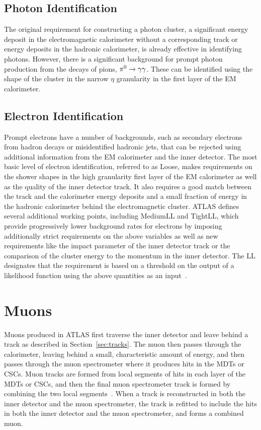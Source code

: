 \subsection{Photon Identification}

The original requirement for constructing a photon cluster, a significant energy deposit in the electromagnetic calorimeter without a corresponding track or energy deposits in the hadronic calorimeter, is already effective in identifying photons.
However, there is a significant background for prompt photon production from the decays of pions, $\pi^0 \rightarrow \gamma\gamma$.
These can be identified using the shape of the cluster in the narrow $\eta$ granularity in the first layer of the \ac{EM} calorimeter.

\subsection{Electron Identification}

Prompt electrons have a number of backgrounds, such as secondary electrons from hadron decays or misidentified hadronic jets, that can be rejected using additional information from the \ac{EM} calorimeter and the inner detector.
The most basic level of electron identification, referred to as Loose, makes requirements on the shower shapes in the high granularity first layer of the \ac{EM} calorimeter as well as the quality of the inner detector track.
It also requires a good match between the track and the calorimeter energy deposits and a small fraction of energy in the hadronic calorimeter behind the electromagnetic cluster.
ATLAS defines several additional working points, including MediumLL and TightLL, which provide progressively lower background rates for electrons by imposing additionally strict requirements on the above variables as well as new requirements like the impact parameter of the inner detector track or the comparison of the cluster energy to the momentum in the inner detector.
The LL designates that the requirement is based on a threshold on the output of a likelihood function using the above quantities as an input~\cite{ATLAS-CONF-2014-032}.


\section{Muons}
\label{sec:muons}

Muons produced in ATLAS first traverse the inner detector and leave behind a track as described in Section~\ref{sec:tracks}.
The muon then passes through the calorimeter, leaving behind a small, characteristic amount of energy, and then passes through the muon spectrometer where it produces hits in the \acp{MDT} or \acp{CSC}.
Muon tracks are formed from local segments of hits in each layer of the \acp{MDT} or \acp{CSC}, and then the final muon spectrometer track is formed by combining the two local segments~\cite{PERF-2015-10}.
When a track is reconstructed in both the inner detector and the muon spectrometer, the track is refitted to include the hits in both the inner detector and the muon spectrometer, and forms a combined muon.

